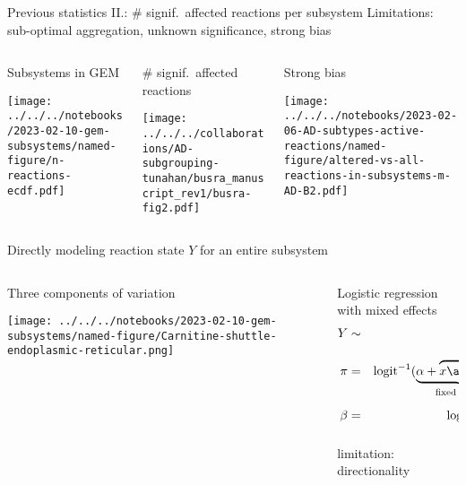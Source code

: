 \documentclass[aspectratio=169]{beamer}
\begin{document}
\begin{frame}{Previous statistics II.: \# signif.~affected reactions per subsystem}
  {Limitations: sub-optimal aggregation, unknown significance, strong bias}
\begin{columns}[t]
\begin{column}{0.3\textwidth}
\begin{center}
  Subsystems in GEM
\end{center}

\texttt{[image: ../../../notebooks/2023-02-10-gem-subsystems/named-figure/n-reactions-ecdf.pdf]}
\end{column}

\begin{column}{0.4\textwidth}
\begin{center}
  \# signif.~affected reactions
\end{center}

\texttt{[image: ../../../collaborations/AD-subgrouping-tunahan/busra\_manuscript\_rev1/busra-fig2.pdf]}
\end{column}
\begin{column}{0.3\textwidth}
\begin{center}
  Strong bias
\end{center}

\texttt{[image: ../../../notebooks/2023-02-06-AD-subtypes-active-reactions/named-figure/altered-vs-all-reactions-in-subsystems-m-AD-B2.pdf]}
\end{column}
\end{columns}
\end{frame}

\begin{frame}{Directly modeling reaction state $Y$ for an entire subsystem}
\begin{columns}[t]
\begin{column}{0.5\textwidth}
  Three components of variation

\texttt{[image: ../../../notebooks/2023-02-10-gem-subsystems/named-figure/Carnitine-shuttle-endoplasmic-reticular.png]}
\end{column}

\begin{column}{0.5\textwidth}
  Logistic regression with mixed effects
\begin{eqnarray*}
Y &\sim& \mathrm{Bin}(n=2, \pi) \\
\pi &=& \mathrm{logit}^{-1} (\underbrace{\alpha + \overbrace{x
    \alert{\beta}}^\text{Dx}}_\text{fixed effects} + \underbrace{\overbrace{z_1
b_1}^\text{samples} + \overbrace{z_2 b_2}^\text{reactions}}_\text{random
effects}) \\
    \beta &=& \log \frac{\pi_{x=1} / (1 - \pi_{x=1})}{\pi_{x=0} / (1 - \pi_{x=0})} = \log \mathrm{OR}
\end{eqnarray*}

\alert{limitation: directionality}
\end{column}
\end{columns}
\end{frame}
\end{document}
